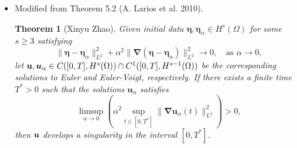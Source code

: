 \documentclass{beamer}
\newtheorem{thm}{Theorem}[section]
\def\Bmp#1{ \begin{minipage}{#1} }
\def\Emp{ \end{minipage} }
\def\be{{\boldsymbol \eta}}
\def\bea{{\boldsymbol \eta_\alpha}}
\def\u{{\bf u}}
\def\ua{\boldsymbol u_\alpha}
\def\bnabla{\boldsymbol{\nabla}}
\begin{document}
\frame
{
\hspace*{-1.0cm}
\Bmp{12cm}
\raggedright

\begin{itemize}
\item<1-> Modified from Theorem 5.2 (A. Larios et al. 2010).
\begin{thm}[Xinyu Zhao] \label{thm:Theorem:1.3}
Given initial data $\be,\bea \in H^s(\Omega)$ for some $s\geq 3$ satisfying
\begin{equation*}
\|\be-\bea\|_{L^2}^2+\alpha^2\|\bnabla(\be-\bea)\|_{L^2}^2 \rightarrow 0, \quad \text{as } \alpha\rightarrow 0,
\end{equation*} 
let $\u,\ua \in C([0,T],H^s(\Omega))\cap C^1([0,T],H^{s-1}(\Omega))$ be the corresponding solutions to Euler and Euler-Voigt, respectively. If there exists a finite time $T^*>0$ such that the solutions $\ua$ satisfies
\begin{equation*}
\limsup_{\alpha \rightarrow 0} \left( \alpha^2 \sup_{t\in[0,T^*]} \|\bnabla \ua(t)\|_{L^2}^2\right) > 0,
\end{equation*}
then $\u$ develops a singularity in the interval $[0,T^*]$.
\end{thm}


\end{itemize}
\Emp
}
\end{document}
